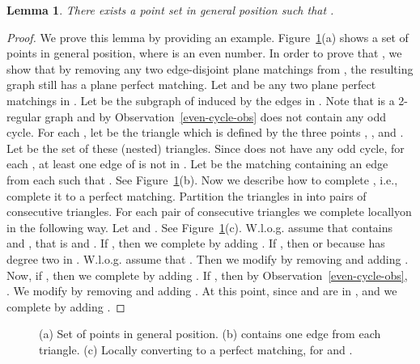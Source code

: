 \documentclass[11pt,a4paper]{article}
\newtheorem{lemma}{Lemma}
\begin{document}
\begin{lemma}
There exists a point set  in general position such that .
\end{lemma}
\begin{proof}
We prove this lemma by providing an example. Figure~\ref{pmp3-fig}(a) shows a set  of  points in general position, where  is an even number. In order to prove that , we show that by removing any two edge-disjoint plane matchings from , the resulting graph still has a plane perfect matching. Let  and  be any two plane perfect matchings in . Let  be the subgraph of  induced by the edges in . Note that  is a 2-regular graph and by Observation~\ref{even-cycle-obs} does not contain any odd cycle. For each , let  be the triangle which is defined by the three points , , and . Let  be the set of these  (nested) triangles. Since  does not have any odd cycle, for each , at least one edge of  is not in . Let  be the matching containing an edge  from each  such that . See Figure~\ref{pmp3-fig}(b). Now we describe how to complete , i.e., complete it to a perfect matching. Partition the triangles in  into  pairs of consecutive triangles. For each pair  of consecutive triangles we complete  locally\textemdash on \textemdash in the following way. Let  and . See Figure~\ref{pmp3-fig}(c). W.l.o.g. assume that  contains  and , that is  and . If , then we complete  by adding . If , then  or  because  has degree two in . W.l.o.g. assume that . Then we modify  by removing  and adding . Now, if , then we complete  by adding . If , then by Observation~\ref{even-cycle-obs}, . We modify  by removing  and adding . At this point, since  and  are in ,  and we complete  by adding .
\end{proof}
\begin{figure}[htb]
  \centering
\setlength{\tabcolsep}{0in}
  
\caption{(a) Set  of  points in general position. (b)  contains one edge from each triangle. (c) Locally converting  to a perfect matching, for  and .}
\label{pmp3-fig}
\end{figure}
\end{document}

